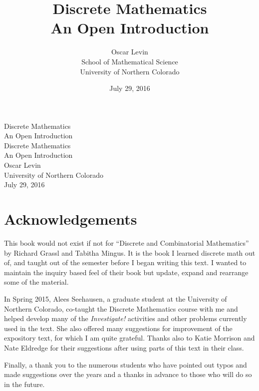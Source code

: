 \documentclass[10pt,]{memoir}
\title{Discrete Mathematics\\
{\large An Open Introduction}}
\author{Oscar Levin\\
School of Mathematical Science\\
University of Northern Colorado
}
\date{July 29, 2016}
\theoremstyle{plain}
\theoremstyle{definition}
\theoremstyle{definition}
\theoremstyle{definition}
\numberwithin{equation}{chapter}
\begin{document}
\frontmatter
\thispagestyle{empty}
{\centering
\vspace*{0.28\textheight}
{\Huge Discrete Mathematics}\\[2\baselineskip]
{\LARGE An Open Introduction}\\
}
\clearpage
\thispagestyle{empty}
\null%
\clearpage
\thispagestyle{empty}
{\centering
\vspace*{0.14\textheight}
{\Huge Discrete Mathematics}\\[\baselineskip]
{\LARGE An Open Introduction}\\[3\baselineskip]
{\Large Oscar Levin}\\[0.5\baselineskip]
{\Large University of Northern Colorado}\\[3\baselineskip]
{\Large July 29, 2016}\\}
\clearpage
\thispagestyle{empty}
\null\clearpage
\chapter*{Acknowledgements}\label{acknowledgement-1}

  This book would not exist if not for ``Discrete and Combinatorial Mathematics'' by Richard Grassl and Tabitha Mingus. It is the book I learned discrete math out of, and taught out of the semester before I began writing this text. I wanted to maintain the inquiry based feel of their book but update, expand and rearrange some of the material.
\par

  In Spring 2015, Alees Seehausen, a graduate student at the University of Northern Colorado, co-taught the Discrete Mathematics course with me and helped develop many of the \emph{Investigate!} activities and other problems currently used in the text. She also offered many suggestions for improvement of the expository text, for which I am quite grateful. Thanks also to Katie Morrison and Nate Eldredge for their suggestions after using parts of this text in their class.
\par

  Finally, a thank you to the numerous students who have pointed out typos and made suggestions over the years and a thanks in advance to those who will do so in the future.
\end{document}
